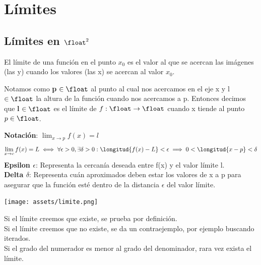 \documentclass[10pt,a4paper]{article}
\begin{document}
\section*{Límites}
\subsection*{Límites en $\float^{2}$}
El límite de una función en el punto $x_{0}$ es el valor al que se acercan las imágenes (las y) cuando los valores (las x) se acercan al valor $x_{0}$. 

Notamos como \textbf{p} $\in \float$ al punto al cual nos acercamos en el eje x y l $\in \float$ la altura de la función cuando nos acercamos a p. Entonces decimos que \textbf{l} $\in \float$ es el límite de $f: \float \rightarrow \float$ cuando x tiende al punto $p \in \float$. 

\textbf{Notación}: $\lim_{x\to p} f(x) = l$ 
\[\lim_{x\to c} f(x) = L \iff \forall \epsilon > 0, \exists \delta > 0 : \longitud{f(x)-L} < \epsilon \implies 0 < \longitud{x-p} < \delta \] 
\textbf{Epsilon $\epsilon$}: Representa la cercanía deseada entre f(x) y el valor límite l. \\
\textbf{Delta $\delta$}: Representa cuán aproximados deben estar los valores de x a p para asegurar que la función esté dentro de la distancia $\epsilon$ del valor límite. 
\begin{center}
    \begin{minipage}[b]{0.5\textwidth}
        \texttt{[image: assets/limite.png]}
        \centering
        \label{fig:limite_nocion}
    \end{minipage}
\end{center}
Si el límite creemos que existe, se prueba por definición. \\
Si el límite creemos que no existe, se da un contraejemplo, por ejemplo buscando iterados. \\
Si el grado del numerador es menor al grado del denominador, rara vez exista el límite. 
\end{document}
